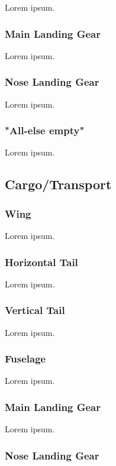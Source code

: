 Lorem ipsum.

\subsubsection{Main Landing Gear}

Lorem ipsum.

\subsubsection{Nose Landing Gear}

Lorem ipsum.

\subsubsection{"All-else empty"}

Lorem ipsum.

\subsection{Cargo/Transport}

\subsubsection{Wing}

Lorem ipsum.

\subsubsection{Horizontal Tail}

Lorem ipsum.

\subsubsection{Vertical Tail}

Lorem ipsum.

\subsubsection{Fuselage}

Lorem ipsum.

\subsubsection{Main Landing Gear}

Lorem ipsum.

\subsubsection{Nose Landing Gear}

